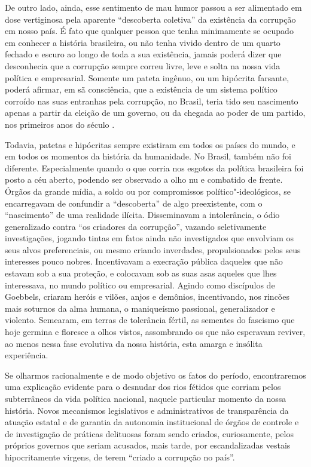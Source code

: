 De outro lado, ainda, esse sentimento de mau humor passou a ser
alimentado em dose vertiginosa pela aparente ``descoberta coletiva'' da
existência da corrupção em nosso país. É fato que qualquer pessoa que
tenha minimamente se ocupado em conhecer a história brasileira, ou não
tenha vivido dentro de um quarto fechado e escuro ao longo de toda a sua
existência, jamais poderá dizer que desconhecia que a corrupção sempre
correu livre, leve e solta na nossa vida política e empresarial.
Somente um pateta ingênuo, ou um hipócrita farsante, poderá afirmar, em
sã consciência, que a existência de um sistema político corroído nas
suas entranhas pela corrupção, no Brasil, teria tido seu nascimento
apenas a partir da eleição de um governo, ou da chegada ao poder de um
partido, nos primeiros anos do século .

Todavia, patetas e hipócritas sempre existiram em todos os países do
mundo, e em todos os momentos da história da humanidade. No Brasil,
também não foi diferente. Especialmente quando o que corria nos esgotos
da política brasileira foi posto a céu aberto, podendo ser observado a
olho nu e combatido de frente. Órgãos da grande mídia, a soldo ou por
compromissos político"-ideológicos, se encarregavam de confundir a
``descoberta'' de algo preexistente, com o ``nascimento'' de uma
realidade ilícita. Disseminavam a intolerância, o ódio generalizado
contra ``os criadores da corrupção'', vazando seletivamente
investigações, jogando tintas em fatos ainda não investigados que
envolviam os seus alvos preferenciais, ou mesmo criando inverdades,
propulsionados pelos seus interesses pouco nobres. Incentivavam a
execração pública daqueles que não estavam sob a sua proteção, e
colocavam sob as suas asas aqueles que lhes interessava, no mundo
político ou empresarial. Agindo como discípulos de Goebbels, criaram
heróis e vilões, anjos e demônios, incentivando, nos rincões mais
soturnos da alma humana, o maniqueísmo passional, generalizador e
violento. Semearam, em terras de tolerância fértil, as sementes do
fascismo que hoje germina e floresce a olhos vistos, assombrando os que
não esperavam reviver, ao menos nessa fase evolutiva da nossa história,
esta amarga e insólita experiência.

Se olharmos racionalmente e de modo objetivo os fatos do período,
encontraremos uma explicação evidente para o desnudar dos rios fétidos
que corriam pelos subterrâneos da vida política nacional, naquele
particular momento da nossa história. Novos mecanismos legislativos e
administrativos de transparência da atuação estatal e de garantia da
autonomia institucional de órgãos de controle e de investigação de
práticas delituosas foram sendo criados, curiosamente, pelos próprios
governos que seriam acusados, mais tarde, por escandalizadas vestais
hipocritamente virgens, de terem ``criado a corrupção no país''.

